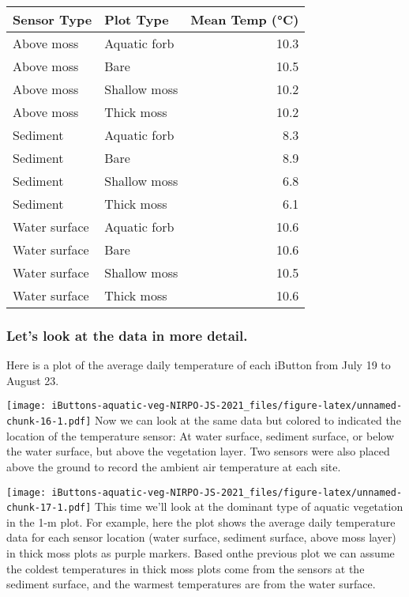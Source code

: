 \documentclass[
]{article}
\begin{document}
\begin{longtable}[]{@{}llr@{}}
\toprule
Sensor Type & Plot Type & Mean Temp (°C) \\
\midrule
\endhead
Above moss & Aquatic forb & 10.3 \\
Above moss & Bare & 10.5 \\
Above moss & Shallow moss & 10.2 \\
Above moss & Thick moss & 10.2 \\
Sediment & Aquatic forb & 8.3 \\
Sediment & Bare & 8.9 \\
Sediment & Shallow moss & 6.8 \\
Sediment & Thick moss & 6.1 \\
Water surface & Aquatic forb & 10.6 \\
Water surface & Bare & 10.6 \\
Water surface & Shallow moss & 10.5 \\
Water surface & Thick moss & 10.6 \\
\bottomrule
\end{longtable}

\hypertarget{lets-look-at-the-data-in-more-detail.}{%
\subsubsection{Let's look at the data in more
detail.}\label{lets-look-at-the-data-in-more-detail.}}

Here is a plot of the average daily temperature of each iButton from
July 19 to August 23.

\texttt{[image: iButtons-aquatic-veg-NIRPO-JS-2021\_files/figure-latex/unnamed-chunk-16-1.pdf]}
Now we can look at the same data but colored to indicated the location
of the temperature sensor: At water surface, sediment surface, or below
the water surface, but above the vegetation layer. Two sensors were also
placed above the ground to record the ambient air temperature at each
site.

\texttt{[image: iButtons-aquatic-veg-NIRPO-JS-2021\_files/figure-latex/unnamed-chunk-17-1.pdf]}
This time we'll look at the dominant type of aquatic vegetation in the
1-m plot. For example, here the plot shows the average daily temperature
data for each sensor location (water surface, sediment surface, above
moss layer) in thick moss plots as purple markers. Based onthe previous
plot we can assume the coldest temperatures in thick moss plots come
from the sensors at the sediment surface, and the warmest temperatures
are from the water surface.
\end{document}
